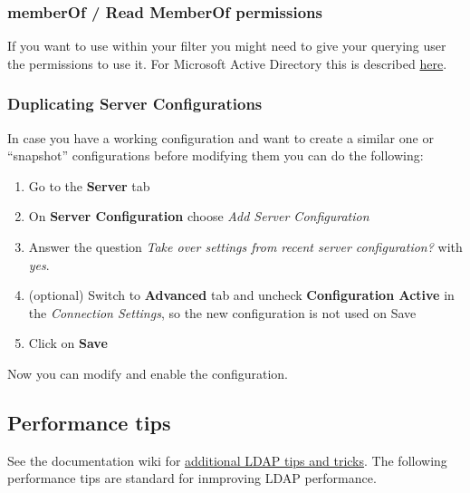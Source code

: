 \documentclass[letterpaper,10pt,english]{sphinxmanual}
\begin{document}
\subsubsection{memberOf / Read MemberOf permissions}
\label{configuration_user/user_auth_ldap:memberof-read-memberof-permissions}
If you want to use  within your filter you might need to give your
querying user the permissions to use it. For Microsoft Active Directory this
is described \href{https://serverfault.com/questions/167371/what-permissions-are-required-for-enumerating-users-groups-in-active-directory/167401\#167401}{here}.


\subsubsection{Duplicating Server Configurations}
\label{configuration_user/user_auth_ldap:duplicating-server-configurations}
In case you have a working configuration and want to create a similar one or
``snapshot'' configurations before modifying them you can do the following:
\begin{enumerate}
\item {} 
Go to the \textbf{Server} tab

\item {} 
On \textbf{Server Configuration} choose \emph{Add Server Configuration}

\item {} 
Answer the question \emph{Take over settings from recent server configuration?}
with \emph{yes}.

\item {} 
(optional) Switch to \textbf{Advanced} tab and uncheck \textbf{Configuration Active}
in the \emph{Connection Settings}, so the new configuration is not used on Save

\item {} 
Click on \textbf{Save}

\end{enumerate}

Now you can modify and enable the configuration.


\subsection{Performance tips}
\label{configuration_user/user_auth_ldap:performance-tips}
See the documentation wiki for \href{https://github.com/owncloud/documentation/wiki/LDAP-Tips-for-Active-Directory-and-openLDAP}{additional LDAP tips and tricks}. The following performance tips are standard for inmproving LDAP performance.
\end{document}
